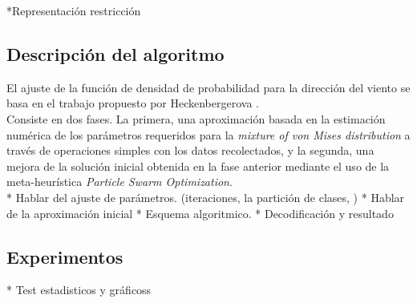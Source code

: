 *Representación restricción


\subsection{Descripción del algoritmo}
El ajuste de la función de densidad de probabilidad para la dirección del viento se basa en el trabajo propuesto por Heckenbergerova \cite{Heckenbergerova15}.\\ 
Consiste en dos fases. La primera, una aproximación basada en la estimación numérica de los parámetros requeridos para la \emph{mixture of von Mises distribution} a través de operaciones simples con los datos recolectados, y la segunda, una mejora de la solución inicial obtenida en la fase anterior mediante el uso de la meta-heurística \emph{Particle Swarm Optimization}. \\

* Hablar del ajuste de parámetros. (iteraciones, la partición de clases,  )
* Hablar de la aproximación inicial
* Esquema algoritmico.
* Decodificación y resultado
\subsection{Experimentos}
* Test estadisticos y gráficoss